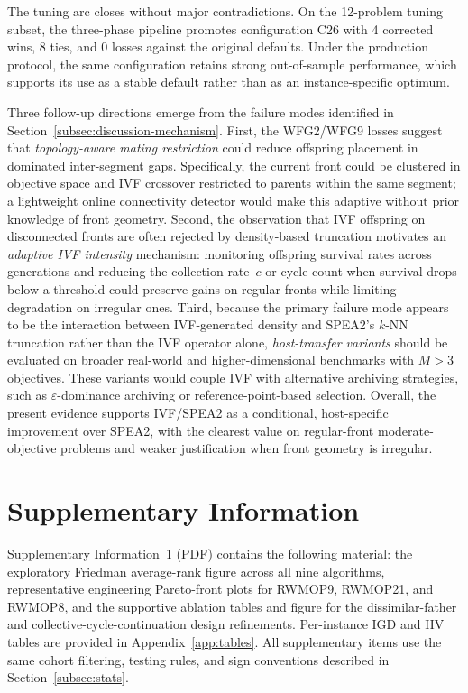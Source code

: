 \documentclass[pdflatex,sn-mathphys-ay]{sn-jnl}%
\theoremstyle{thmstyleone}%
\theoremstyle{thmstyletwo}%
\theoremstyle{thmstylethree}%
\begin{document}
The tuning arc closes without major contradictions. On the 12-problem tuning subset, the three-phase pipeline promotes configuration C26 with 4 corrected wins, 8 ties, and 0 losses against the original defaults. Under the production protocol, the same configuration retains strong out-of-sample performance, which supports its use as a stable default rather than as an instance-specific optimum.

Three follow-up directions emerge from the failure modes identified in Section~\ref{subsec:discussion-mechanism}. First, the WFG2/WFG9 losses suggest that \emph{topology-aware mating restriction} could reduce offspring placement in dominated inter-segment gaps. Specifically, the current front could be clustered in objective space and IVF crossover restricted to parents within the same segment; a lightweight online connectivity detector would make this adaptive without prior knowledge of front geometry. Second, the observation that IVF offspring on disconnected fronts are often rejected by density-based truncation motivates an \emph{adaptive IVF intensity} mechanism: monitoring offspring survival rates across generations and reducing the collection rate~$c$ or cycle count when survival drops below a threshold could preserve gains on regular fronts while limiting degradation on irregular ones. Third, because the primary failure mode appears to be the interaction between IVF-generated density and SPEA2's $k$-NN truncation rather than the IVF operator alone, \emph{host-transfer variants} should be evaluated on broader real-world and higher-dimensional benchmarks with $M>3$ objectives. These variants would couple IVF with alternative archiving strategies, such as $\varepsilon$-dominance archiving or reference-point-based selection. Overall, the present evidence supports IVF/SPEA2 as a conditional, host-specific improvement over SPEA2, with the clearest value on regular-front moderate-objective problems and weaker justification when front geometry is irregular.

\section*{Supplementary Information}

Supplementary Information~1 (PDF) contains the following material: the exploratory Friedman average-rank figure across all nine algorithms, representative engineering Pareto-front plots for RWMOP9, RWMOP21, and RWMOP8, and the supportive ablation tables and figure for the dissimilar-father and collective-cycle-continuation design refinements. Per-instance IGD and HV tables are provided in Appendix~\ref{app:tables}. All supplementary items use the same cohort filtering, testing rules, and sign conventions described in Section~\ref{subsec:stats}.
\end{document}
